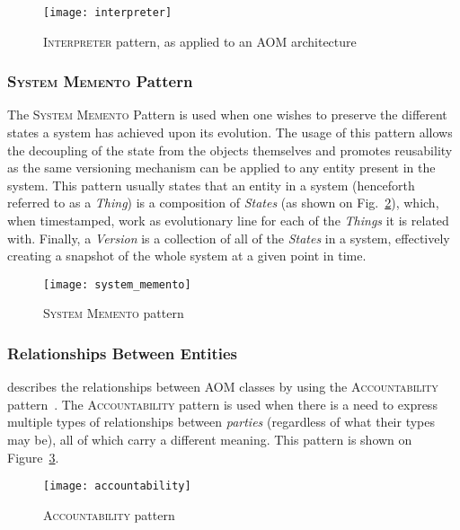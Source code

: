 \begin{figure}[H]
  \centering
  \texttt{[image: interpreter]}
  \caption{\textsc{Interpreter} pattern, as applied to an AOM architecture}
  \label{fig:interpreter_pattern}
\end{figure}

\subsubsection{\textsc{System Memento} Pattern}\label{sec:system_memento_pattern}

The \textsc{System Memento} Pattern is used when one wishes to preserve the different states a system has achieved upon its evolution. The usage of this pattern allows the decoupling of the state from the objects themselves and promotes reusability as the same versioning mechanism can be applied to any entity present in the system. This pattern usually states that an entity in a system (henceforth referred to as a \emph{Thing}) is a composition of \emph{States} (as shown on Fig.~\ref{fig:system_memento}), which, when timestamped, work as evolutionary line for each of the \emph{Things} it is related with. Finally, a \emph{Version} is a collection of all of the \emph{States} in a system, effectively creating a snapshot of the whole system at a given point in time.

\begin{figure}[H]
  \centering
  \texttt{[image: system\_memento]}
  \caption{\textsc{System Memento} pattern}
  \label{fig:system_memento}
\end{figure}

\subsubsection{Relationships Between Entities}\label{sec:relationships_between_entities}

\cite{YJ02} describes the relationships between AOM classes by using the \textsc{Accountability} pattern~\cite{fowler, hay}. The \textsc{Accountability} pattern is used when there is a need to express multiple types of relationships between \emph{parties} (regardless of what their types may be), all of which carry a different meaning\cite{fowler_accountability}. This pattern is shown on Figure~\ref{fig:accountability}.

\begin{figure}[H]
  \centering
  \texttt{[image: accountability]}
  \caption{\textsc{Accountability} pattern}
  \label{fig:accountability}
\end{figure}

